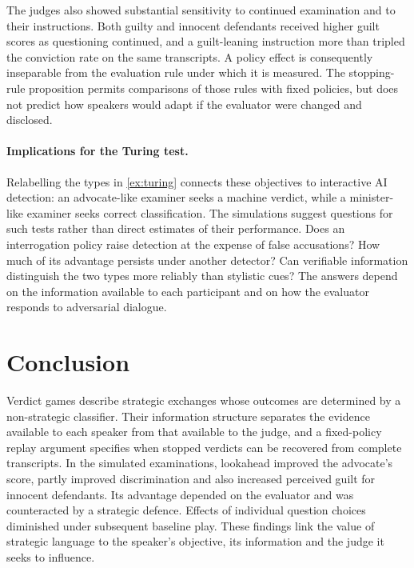 The judges also showed substantial sensitivity to continued examination and to their instructions. Both guilty
and innocent defendants received higher guilt scores as questioning continued, and a guilt-leaning instruction
more than tripled the conviction rate on the same transcripts. A policy effect is consequently inseparable from
the evaluation rule under which it is measured. The stopping-rule proposition permits comparisons of those rules
with fixed policies, but does not predict how speakers would adapt if the evaluator were changed and disclosed.

\paragraph{Implications for the Turing test.}
Relabelling the types in \cref{ex:turing} connects these objectives to interactive AI detection: an advocate-like
examiner seeks a machine verdict, while a minister-like examiner seeks correct classification. The simulations
suggest questions for such tests rather than direct estimates of their performance. Does an interrogation policy
raise detection at the expense of false accusations? How much of its advantage persists under another detector?
Can verifiable information distinguish the two types more reliably than stylistic cues? The answers depend on
the information available to each participant and on how the evaluator responds to adversarial dialogue.



\section{Conclusion}
Verdict games describe strategic exchanges whose outcomes are determined by a non-strategic classifier. Their
information structure separates the evidence available to each speaker from that available to the judge, and a
fixed-policy replay argument specifies when stopped verdicts can be recovered from complete transcripts.
In the simulated examinations, lookahead improved the advocate's score, partly improved discrimination and also
increased perceived guilt for innocent defendants. Its advantage depended on the evaluator and was counteracted
by a strategic defence. Effects of individual question choices diminished under subsequent baseline play.
These findings link the value of strategic language to the speaker's objective, its information and the judge
it seeks to influence.
